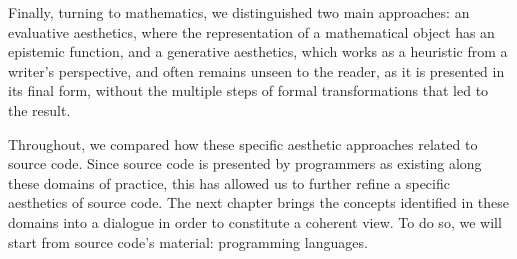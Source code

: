 Finally, turning to mathematics, we distinguished two main approaches: an evaluative aesthetics, where the representation of a mathematical object has an epistemic function, and a generative aesthetics, which works as a heuristic from a writer's perspective, and often remains unseen to the reader, as it is presented in its final form, without the multiple steps of formal transformations that led to the result.

Throughout, we compared how these specific aesthetic approaches related to source code. Since source code is presented by programmers as existing along these domains of practice, this has allowed us to further refine a specific aesthetics of source code. The next chapter brings the concepts identified in these domains into a dialogue in order to constitute a coherent view. To do so, we will start from source code's material: programming languages.
